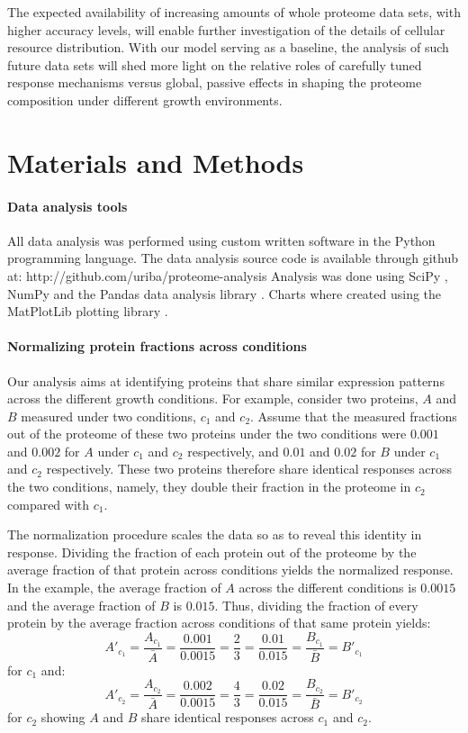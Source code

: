 \documentclass[10pt,letterpaper]{article}
\begin{document}
The expected availability of increasing amounts of whole proteome data sets, with higher accuracy levels, will enable further investigation of the details of cellular resource distribution.
With our model serving as a baseline, the analysis of such future data sets will shed more light on the relative roles of carefully tuned response mechanisms versus global, passive effects in shaping the proteome composition under different growth environments.

\section*{Materials and Methods}
\paragraph{Data analysis tools}

All data analysis was performed using custom written software in the Python programming language.
The data analysis source code is available through github at: http://github.com/uriba/proteome-analysis
Analysis was done using SciPy \cite{Oliphant2007}, NumPy \cite{Community2011} and the Pandas data analysis library \cite{McKinney2011}.
Charts where created using the MatPlotLib plotting library \cite{Hunter2007}.

\paragraph{Normalizing protein fractions across conditions}

Our analysis aims at identifying proteins that share similar expression patterns across the different growth conditions.
For example, consider two proteins, $A$ and $B$ measured under two conditions, $c_1$ and $c_2$.
Assume that the measured fractions out of the proteome of these two proteins under the two conditions were $0.001$ and $0.002$ for $A$ under $c_1$ and $c_2$ respectively, and $0.01$ and $0.02$ for $B$ under $c_1$ and $c_2$ respectively.
These two proteins therefore share identical responses across the two conditions, namely, they double their fraction in the proteome in $c_2$ compared with $c_1$.

The normalization procedure scales the data so as to reveal this identity in response.
Dividing the fraction of each protein out of the proteome by the average fraction of that protein across conditions yields the normalized response.
In the example, the average fraction of $A$ across the different conditions is $0.0015$ and the average fraction of $B$ is $0.015$.
Thus, dividing the fraction of every protein by the average fraction across conditions of that same protein yields:
\[
A'_{c_1}=\frac{A_{c_1}}{\bar{A}}=\frac{0.001}{0.0015}=\frac{2}{3}=\frac{0.01}{0.015}=\frac{B_{c_1}}{\bar{B}}=B'_{c_1}
\]
for $c_1$ and:
\[
A'_{c_2}=\frac{A_{c_2}}{\bar{A}}=\frac{0.002}{0.0015}=\frac{4}{3}=\frac{0.02}{0.015}=\frac{B_{c_2}}{\bar{B}}=B'_{c_2}
\]
for $c_2$ showing $A$ and $B$ share identical responses across $c_1$ and $c_2$.
\end{document}
